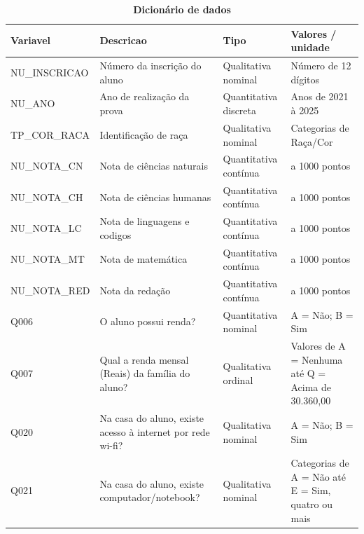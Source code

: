 \documentclass{article}
\begin{document}
\begin{table}[ht]
\centering
 
\caption*{\textbf{Dicionário de dados}}
 
\vspace{0.2cm}
 
\renewcommand{\arraystretch}{1.8} %
 
\begin{tabularx}{\textwidth}{
>{\centering\arraybackslash}p{3cm} %
>{\raggedright\arraybackslash}X     %
>{\centering\arraybackslash}p{4cm}  %
>{\centering\arraybackslash}p{4cm}  %
}
\toprule
\textbf{Variavel} &
\textbf{Descricao} &
\textbf{Tipo} &
\textbf{Valores / unidade} \\
\midrule
 
 
NU\_INSCRICAO&Número da inscrição do aluno&Qualitativa nominal& Número de 12 dígitos \\[0.3cm]
NU\_ANO&Ano de realização da prova&Quantitativa discreta& Anos de 2021 à 2025 \\[0.3cm]
TP\_COR\_RACA& Identificação de raça& Qualitativa nominal & Categorias de Raça/Cor & \\[0.3cm]
NU\_NOTA\_CN& Nota de ciências naturais & Quantitativa contínua & 0 a 1000 pontos \\[0.3cm]
NU\_NOTA\_CH& Nota de ciências humanas& Quantitativa contínua & 0 a 1000 pontos \\[0.3cm]
NU\_NOTA\_LC& Nota de linguagens e codigos & Quantitativa contínua & 0 a 1000 pontos \\[0.3cm]
NU\_NOTA\_MT& Nota de matemática &Quantitativa contínua & 0 a 1000 pontos \\[0.3cm]
NU\_NOTA\_RED& Nota da redação & Quantitativa contínua & 0 a 1000 pontos \\[0.3cm]
Q006& O aluno possui renda? & Quantitativa nominal & A = Não; B = Sim  \\[0.3cm]
Q007& Qual a renda mensal (Reais) da família do aluno? & Qualitativa ordinal & Valores de A = Nenhuma até Q = Acima de 30.360,00 \\[0.3cm]
Q020& Na casa do aluno, existe acesso à internet por rede wi-fi? & Qualitativa nominal & A = Não; B = Sim \\[0.3cm]
Q021& Na casa do aluno, existe computador/notebook? & Qualitativa nominal & Categorias de A = Não até E = Sim, quatro ou mais \\[0.3cm]

\bottomrule
\end{tabularx}
 
\end{table}
 
\end{document}

